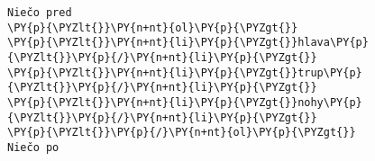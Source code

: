 \begin{Verbatim}[commandchars=\\\{\}]
Niečo pred
\PY{p}{\PYZlt{}}\PY{n+nt}{ol}\PY{p}{\PYZgt{}}
\PY{p}{\PYZlt{}}\PY{n+nt}{li}\PY{p}{\PYZgt{}}hlava\PY{p}{\PYZlt{}}\PY{p}{/}\PY{n+nt}{li}\PY{p}{\PYZgt{}}
\PY{p}{\PYZlt{}}\PY{n+nt}{li}\PY{p}{\PYZgt{}}trup\PY{p}{\PYZlt{}}\PY{p}{/}\PY{n+nt}{li}\PY{p}{\PYZgt{}}
\PY{p}{\PYZlt{}}\PY{n+nt}{li}\PY{p}{\PYZgt{}}nohy\PY{p}{\PYZlt{}}\PY{p}{/}\PY{n+nt}{li}\PY{p}{\PYZgt{}}
\PY{p}{\PYZlt{}}\PY{p}{/}\PY{n+nt}{ol}\PY{p}{\PYZgt{}}
Niečo po
\end{Verbatim}
